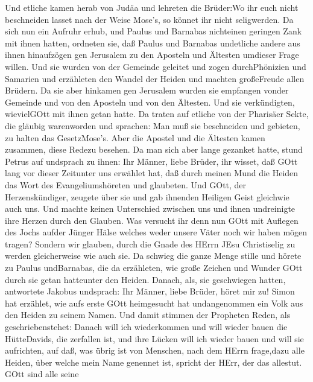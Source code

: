  Und etliche kamen herab von Judäa und lehreten die
Brüder:Wo ihr euch nicht beschneiden lasset nach der Weise Mose's, so
könnet ihr nicht seligwerden.  Da sich nun ein Aufruhr
erhub, und Paulus und Barnabas nichteinen geringen Zank mit ihnen
hatten, ordneten sie, daß Paulus und Barnabas undetliche andere aus
ihnen hinaufzögen gen Jerusalem zu den Aposteln und Ältesten umdieser
Frage willen.  Und sie wurden von der Gemeinde geleitet und
zogen durchPhönizien und Samarien und erzähleten den Wandel der Heiden
und machten großeFreude allen Brüdern.  Da sie aber hinkamen
gen Jerusalem wurden sie empfangen vonder Gemeinde und von den Aposteln
und von den Ältesten. Und sie verkündigten, wievielGOtt mit ihnen getan
hatte.  Da traten auf etliche von der Pharisäer Sekte, die
gläubig warenworden und sprachen: Man muß sie beschneiden und gebieten,
zu halten das GesetzMose's.  Aber die Apostel und die
Ältesten kamen zusammen, diese Redezu besehen.  Da man sich
aber lange gezanket hatte, stund Petrus auf undsprach zu ihnen: Ihr
Männer, liebe Brüder, ihr wisset, daß GOtt lang vor dieser Zeitunter uns
erwählet hat, daß durch meinen Mund die Heiden das Wort des
Evangeliumshöreten und glaubeten.  Und GOtt, der
Herzenskündiger, zeugete über sie und gab ihnenden Heiligen Geist
gleichwie auch uns.  Und machte keinen Unterschied zwischen
uns und ihnen undreinigte ihre Herzen durch den Glauben. 
Was versucht ihr denn nun GOtt mit Auflegen des Jochs aufder Jünger
Hälse welches weder unsere Väter noch wir haben mögen tragen?
 Sondern wir glauben, durch die Gnade des HErrn JEsu
Christiselig zu werden gleicherweise wie auch sie.  Da
schwieg die ganze Menge stille und hörete zu Paulus undBarnabas, die da
erzähleten, wie große Zeichen und Wunder GOtt durch sie getan hatteunter
den Heiden.  Danach, als, sie geschwiegen hatten,
antwortete Jakobus undsprach: Ihr Männer, liebe Brüder, höret mir zu!
 Simon hat erzählet, wie aufs erste GOtt heimgesucht hat
undangenommen ein Volk aus den Heiden zu seinem Namen.  Und
damit stimmen der Propheten Reden, als geschriebenstehet: 
Danach will ich wiederkommen und will wieder bauen die HütteDavids, die
zerfallen ist, und ihre Lücken will ich wieder bauen und will sie
aufrichten,  auf daß, was übrig ist von Menschen, nach dem
HErrn frage,dazu alle Heiden, über welche mein Name genennet ist,
spricht der HErr, der das allestut.  GOtt sind alle seine
